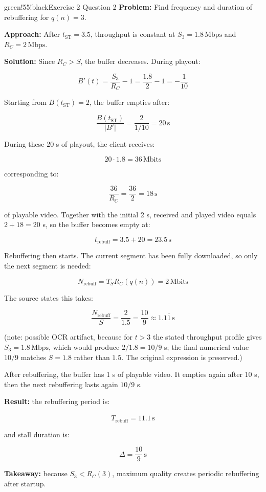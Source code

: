 \begin{calloutbox}{green!55!black}{Exercise 2 Question 2}
\textbf{Problem:} Find frequency and duration of rebuffering for $q(n)=3$.

\textbf{Approach:} After $t_{\text{ST}}=3.5$, throughput is constant at $S_3=1.8\,\text{Mbps}$ and $R_C=2\,\text{Mbps}$.

\textbf{Solution:} Since $R_C>S$, the buffer decreases. During playout:

\[
B'(t) = \frac{S_3}{R_C} - 1 = \frac{1.8}{2} - 1 = -\frac{1}{10}
\]

Starting from $B(t_{\text{ST}})=2$, the buffer empties after:

\[
\frac{B(t_{\text{ST}})}{|B'|} = \frac{2}{1/10} = 20\,\text{s}
\]

During these 20 s of playout, the client receives:

\[
20 \cdot 1.8 = 36\,\text{Mbits}
\]

corresponding to:

\[
\frac{36}{R_C} = \frac{36}{2} = 18\,\text{s}
\]

of playable video. Together with the initial 2 s, received and played video equals $2+18=20$ s, so the buffer becomes empty at:

\[
t_{\text{rebuff}} = 3.5 + 20 = 23.5\,\text{s}
\]

Rebuffering then starts. The current segment has been fully downloaded, so only the next segment is needed:

\[
N_{\text{rebuff}} = T_S R_C(q(n)) = 2\,\text{Mbits}
\]

The source states this takes:

\[
\frac{N_{\text{rebuff}}}{S} = \frac{2}{1.5} = \frac{10}{9} \approx 1.1\overline{1}\,\text{s}
\]

(note: possible OCR artifact, because for $t>3$ the stated throughput profile gives $S_3=1.8\,\text{Mbps}$, which would produce $2/1.8=10/9$ s; the final numerical value $10/9$ matches $S=1.8$ rather than $1.5$. The original expression is preserved.)

After rebuffering, the buffer has 1 s of playable video. It empties again after 10 s, then the next rebuffering lasts again $10/9$ s.

\textbf{Result:} the rebuffering period is:

\[
T_{\text{rebuff}} = 11.\overline{1}\,\text{s}
\]

and stall duration is:

\[
\Delta = \frac{10}{9}\,\text{s}
\]

\textbf{Takeaway:} because $S_3<R_C(3)$, maximum quality creates periodic rebuffering after startup.
\end{calloutbox}

